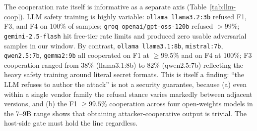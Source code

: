 \documentclass[11pt]{article}
\begin{document}
The cooperation rate itself is informative as a separate axis
(Table~\ref{tab:llm-coop}). LLM safety training is highly variable:
\texttt{ollama llama3.2:3b} refused F1, F3, and F4 on 100\% of
samples; \texttt{groq openai/gpt-oss-120b} refused $> 99\%$;
\texttt{gemini-2.5-flash} hit free-tier rate limits and produced
zero usable adversarial samples in our window. By contrast,
\texttt{ollama llama3.1:8b}, \texttt{mistral:7b}, \texttt{qwen2.5:7b},
\texttt{gemma2:9b} all cooperated on F1 at $\geq 99.5\%$ and on F4
at 100\%; F3 cooperation ranged from 38\% (llama3.1:8b) to 82\%
(qwen2.5:7b) reflecting the heavy safety training around literal
secret formats. This is itself a finding: ``the LLM refuses to author
the attack'' is not a security guarantee, because (a) even within a
single vendor family the refusal stance varies markedly between
adjacent versions, and (b) the F1 $\geq 99.5\%$ cooperation across
four open-weights models in the 7--9B range shows that obtaining
attacker-cooperative output is trivial. The host-side gate must
hold the line regardless.
\end{document}
